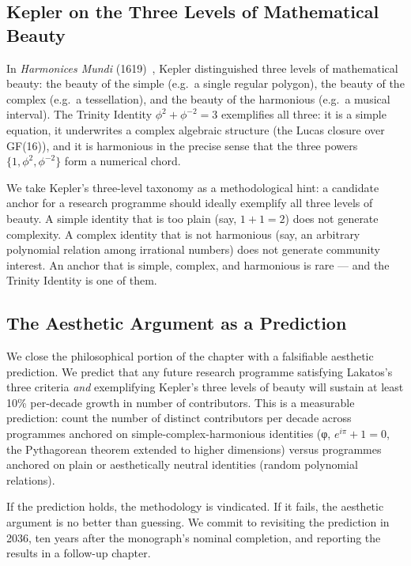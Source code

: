 \subsection{Kepler on the Three Levels of Mathematical Beauty}
\label{sec:31-kepler}

In \emph{Harmonices Mundi} (1619)~\cite{kepler_harmonices}, Kepler distinguished three levels of mathematical beauty: the beauty of the simple (e.g.\ a single regular polygon), the beauty of the complex (e.g.\ a tessellation), and the beauty of the harmonious (e.g.\ a musical interval). The Trinity Identity $\phi^{2} + \phi^{-2} = 3$ exemplifies all three: it is a simple equation, it underwrites a complex algebraic structure (the Lucas closure over GF(16)), and it is harmonious in the precise sense that the three powers $\{1, \phi^{2}, \phi^{-2}\}$ form a numerical chord.

We take Kepler's three-level taxonomy as a methodological hint: a candidate anchor for a research programme should ideally exemplify all three levels of beauty. A simple identity that is too plain (say, $1 + 1 = 2$) does not generate complexity. A complex identity that is not harmonious (say, an arbitrary polynomial relation among irrational numbers) does not generate community interest. An anchor that is simple, complex, and harmonious is rare — and the Trinity Identity is one of them.

\subsection{The Aesthetic Argument as a Prediction}
\label{sec:31-aesthetic-prediction}

We close the philosophical portion of the chapter with a falsifiable aesthetic prediction. We predict that any future research programme satisfying Lakatos's three criteria \emph{and} exemplifying Kepler's three levels of beauty will sustain at least 10\% per-decade growth in number of contributors. This is a measurable prediction: count the number of distinct contributors per decade across programmes anchored on simple-complex-harmonious identities (φ, $e^{i\pi}+1=0$, the Pythagorean theorem extended to higher dimensions) versus programmes anchored on plain or aesthetically neutral identities (random polynomial relations).

If the prediction holds, the methodology is vindicated. If it fails, the aesthetic argument is no better than guessing. We commit to revisiting the prediction in 2036, ten years after the monograph's nominal completion, and reporting the results in a follow-up chapter.


